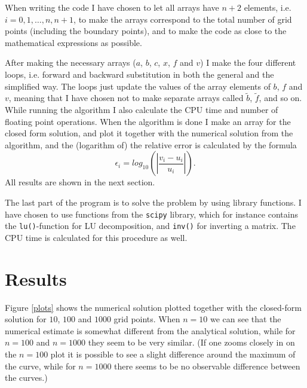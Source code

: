 \documentclass[12pt, a4paper]{article}
\begin{document}
When writing the code I have chosen to let all arrays have $n+2$ elements, i.e. $i = 0,1,\dots,n,n+1$, to 
make the arrays correspond to the total number of grid points (including the boundary points), and 
to make the code as close to the mathematical expressions as possible.

After making the necessary arrays ($a$, $b$, $c$, $x$, $f$ and $v$) I make the four different loops, i.e. 
forward and backward substitution in both the general and the simplified way. The loops just update the 
values of the array elements of $b$, $f$ and $v$, meaning that I have chosen not to make separate arrays 
called $\tilde{b}$, $\tilde{f}$, and so on. While running the algorithm I also calculate the CPU time and
number of floating point operations. When the algorithm is done I make an array for the closed form 
solution, and plot it together with the numerical solution from the algorithm, and the (logarithm of) 
the relative error is calculated by the formula
\begin{equation}
\epsilon_i = log_{10}\left(\left| \frac{v_i - u_i}{u_i} \right| \right). 
\label{eq:error}
\end{equation}
All results are shown in the next section. 
   
The last part of the program is to solve the problem by using library functions. I have chosen to use 
functions from the \texttt{scipy} library, which for instance contains the \texttt{lu()}-function for 
LU decomposition, and \texttt{inv()} for inverting a matrix. The CPU time is calculated for this procedure 
as well.  


\section{Results}

Figure \ref{plots} shows the numerical solution plotted together with the closed-form solution for 
$10$, $100$ and $1000$ grid points. When $n=10$ we can see that the numerical estimate is somewhat 
different from the analytical solution, while for $n=100$ and $n=1000$ they seem to be very similar. 
(If one zooms closely in on the $n=100$ plot it is possible to see a slight difference around the 
maximum of the curve, while for $n=1000$ there seems to be no observable difference between the curves.) 
\end{document}
